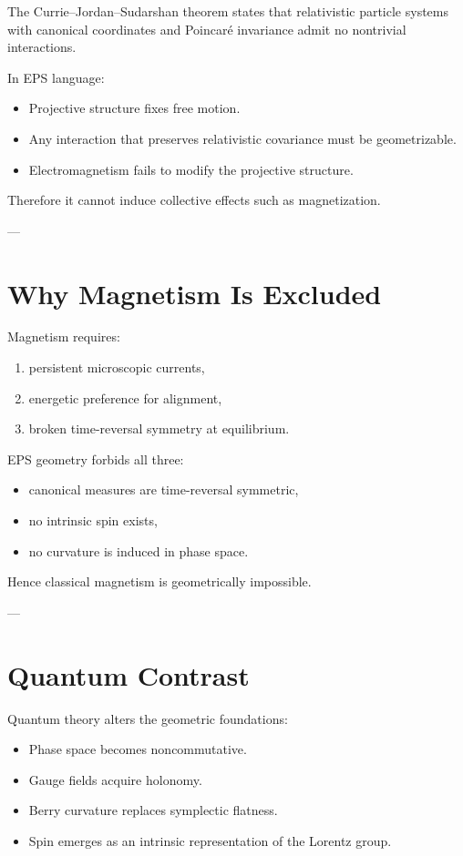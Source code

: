 \documentclass[11pt]{article}
\begin{document}
The Currie–Jordan–Sudarshan theorem states that relativistic particle systems with canonical coordinates and Poincaré invariance admit no nontrivial interactions.

In EPS language:
\begin{itemize}
\item Projective structure fixes free motion.
\item Any interaction that preserves relativistic covariance must be geometrizable.
\item Electromagnetism fails to modify the projective structure.
\end{itemize}

Therefore it cannot induce collective effects such as magnetization.

---

\section{Why Magnetism Is Excluded}

Magnetism requires:
\begin{enumerate}
\item persistent microscopic currents,
\item energetic preference for alignment,
\item broken time-reversal symmetry at equilibrium.
\end{enumerate}

EPS geometry forbids all three:
\begin{itemize}
\item canonical measures are time-reversal symmetric,
\item no intrinsic spin exists,
\item no curvature is induced in phase space.
\end{itemize}

Hence classical magnetism is geometrically impossible.

---

\section{Quantum Contrast}

Quantum theory alters the geometric foundations:

\begin{itemize}
\item Phase space becomes noncommutative.
\item Gauge fields acquire holonomy.
\item Berry curvature replaces symplectic flatness.
\item Spin emerges as an intrinsic representation of the Lorentz group.
\end{itemize}
\end{document}
